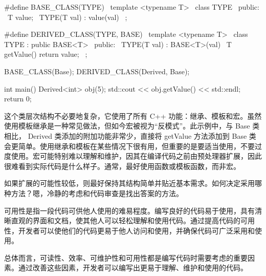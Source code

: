 \begin{cpp}
#define BASE_CLASS(TYPE) \
    template <typename T> \
    class TYPE { \
    public: \
        T value; \
        TYPE(T val) : value(val) {} \
    };

#define DERIVED_CLASS(TYPE, BASE) \
    template <typename T> \
    class TYPE : public BASE<T> { \
    public: \
        TYPE(T val) : BASE<T>(val) {} \
        T getValue() { return value; } \
    };

BASE_CLASS(Base);
DERIVED_CLASS(Derived, Base);

int main() {
    Derived<int> obj(5);
    std::cout << obj.getValue() << std::endl;
    return 0;
}
\end{cpp}

这个类层次结构不必要地复杂，它使用了所有 C++ 功能：继承、模板和宏。虽然使用模板继承是一种常见做法，但如今宏被视为“反模式”。此示例中，与 Base 类相比， Derived 类添加的附加功能非常少，直接将 getValue 方法添加到 Base 类会更简单。使用继承和模板在某些情况下很有用，但重要的是要适当使用，不要过度使用。宏可能特别难以理解和维护，因其在编译代码之前由预处理器扩展，因此很难看到实际代码是什么样子。通常，最好使用函数或模板函数，而非宏。

如果扩展的可能性较低，则最好保持其结构简单并贴近基本需求。如何决定采用哪种方法？嗯，冷静的考虑和代码审查是找出答案的方法。


可用性是指一段代码可供他人使用的难易程度。编写良好的代码易于使用，具有清晰直观的界面和文档，使其他人可以轻松理解和使用代码。通过提高代码的可用性，开发者可以使他们的代码更易于他人访问和使用，并确保代码可广泛采用和使用。

总体而言，可读性、效率、可维护性和可用性都是编写代码时需要考虑的重要因素。通过改善这些因素，开发者可以编写出更易于理解、维护和使用的代码。










